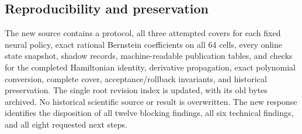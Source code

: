 \subsection{Reproducibility and preservation}\label{sec:reproducibility}
The new source contains a protocol, all three attempted covers for each fixed neural policy, exact rational Bernstein coefficients on all 64 cells, every online state snapshot, shadow records, machine-readable publication tables, and checks for the completed Hamiltonian identity, derivative propagation, exact polynomial conversion, complete cover, acceptance/rollback invariants, and historical preservation. The single root revision index is updated, with its old bytes archived. No historical scientific source or result is overwritten. The new response identifies the disposition of all twelve blocking findings, all six technical findings, and all eight requested next steps.
